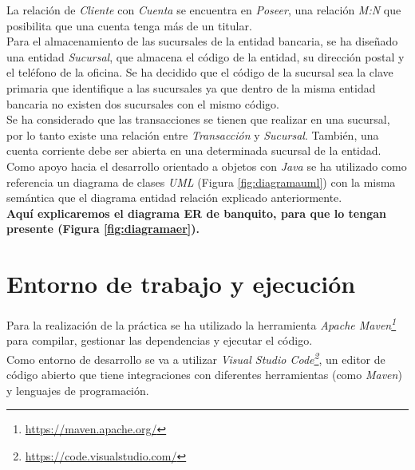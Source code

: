 \documentclass[11pt,a4paper]{article}
\begin{document}
La relación de \emph{Cliente} con \emph{Cuenta} se encuentra en \emph{Poseer}, una relación \emph{M:N} que posibilita que una cuenta tenga más de un titular.\\
Para el almacenamiento de las sucursales de la entidad bancaria, se ha diseñado una entidad \emph{Sucursal}, que almacena el código de la entidad, su dirección postal y el teléfono de la oficina. Se ha decidido que el código de la sucursal sea la clave primaria que identifique a las sucursales ya que dentro de la misma entidad bancaria no existen dos sucursales con el mismo código.\\
Se ha considerado que las transacciones se tienen que realizar en una sucursal, por lo tanto existe una relación entre \emph{Transacción} y \emph{Sucursal}. También, una cuenta corriente debe ser abierta en una determinada sucursal de la entidad.\\

Como apoyo hacia el desarrollo orientado a objetos con \emph{Java} se ha utilizado como referencia un diagrama de clases \emph{UML} (Figura \ref{fig:diagramauml}) con la misma semántica que el diagrama entidad relación explicado anteriormente.\\

\textbf{Aquí explicaremos el diagrama ER de banquito, para que lo tengan presente (Figura \ref{fig:diagramaer}).}

\section{Entorno de trabajo y ejecución}

Para la realización de la práctica se ha utilizado la herramienta \emph{Apache Maven\footnote{\url{https://maven.apache.org/}}} para compilar, gestionar las dependencias y ejecutar el código.\\
Como entorno de desarrollo se va a utilizar \emph{Visual Studio Code\footnote{\url{https://code.visualstudio.com/}}}, un editor de código abierto que tiene integraciones con diferentes herramientas (como \emph{Maven}) y lenguajes de programación.\\
\end{document}
